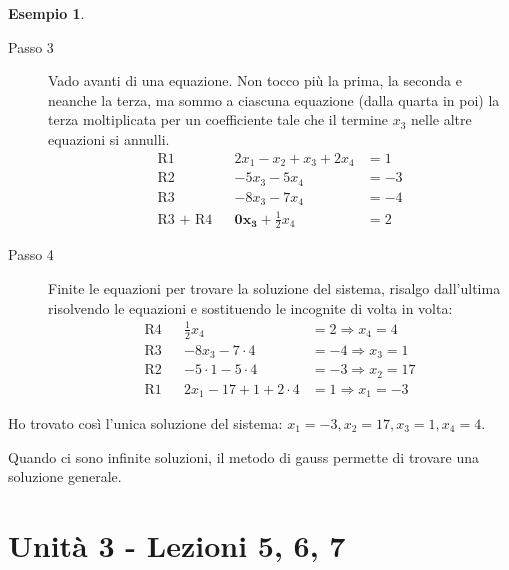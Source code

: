 \documentclass[a4paper]{article}
\theoremstyle{definition}
\newtheorem*{es}{Esempio}
\begin{document}
\begin{es}
\begin{description}
		\item[Passo 3] Vado avanti di una equazione. Non tocco più la prima, la seconda e neanche la terza, ma sommo a ciascuna equazione (dalla quarta in poi) la terza moltiplicata per un coefficiente tale che il termine $x_3$ nelle altre equazioni si annulli.
		      \begin{align*}
			      \text{R1}      &  & 2x_1 - x_2 + x_3 + 2x_4        & = 1   \\
			      \text{R2}      &  & - 5x_3 - 5x_4                  & = -3  \\
			      \text{R3}      &  & - 8x_3 - 7x_4                  & = - 4 \\
			      \text{R3 + R4} &  & \mathbf{0x_3} + \frac{1}{2}x_4 & = 2
		      \end{align*}
		\item[Passo 4] Finite le equazioni per trovare la soluzione del sistema, risalgo dall'ultima risolvendo le equazioni e sostituendo le incognite di volta in volta:
		      \begin{align*}
			      \text{R4} &  & \frac{1}{2}x_4            & = 2 \Rightarrow x_4 = 4   \\
			      \text{R3} &  & - 8x_3 - 7 \cdot 4        & = -4 \Rightarrow x_3 = 1  \\
			      \text{R2} &  & - 5 \cdot 1 - 5 \cdot 4   & = -3 \Rightarrow x_2 = 17 \\
			      \text{R1} &  & 2x_1 - 17 + 1 + 2 \cdot 4 & = 1 \Rightarrow x_1 = - 3
		      \end{align*}
	\end{description}
	Ho trovato così l'unica soluzione del sistema: $x_1 = -3, x_2 = 17, x_3 = 1, x_4 = 4$.
\end{es}
Quando ci sono infinite soluzioni, il metodo di gauss permette di trovare una soluzione generale.
\section{Unità 3 - Lezioni 5, 6, 7}
\end{document}
